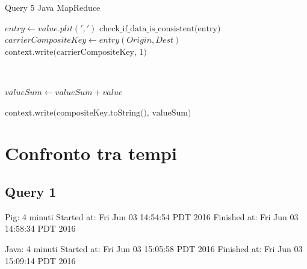 \documentclass[11pt]{article} %
\begin{document}
\begin{algorithm}
\caption{Query 5 Java MapReduce}\label{euclid}
\begin{algorithmic}[0]


\State $entry \gets value.plit(',')$
\State $\text{check\_if\_data\_is\_consistent(entry)}$
\State $carrierCompositeKey \gets entry(Origin, Dest)$
\State $\text{context.write(carrierCompositeKey, 1)}$

\EndProcedure

~


	\State $valueSum \gets valueSum + value$
\EndFor

\State $\text{context.write(compositeKey.toString(), valueSum)}$

\EndProcedure


\end{algorithmic}
\end{algorithm}


\section{Confronto tra tempi}

\subsection{Query 1}
Pig: 4 minuti	 Started at: Fri Jun 03 14:54:54 PDT 2016	 Finished at: Fri Jun 03 14:58:34 PDT 2016

Java: 4 minuti	 Started at: Fri Jun 03 15:05:58 PDT 2016	 Finished at: Fri Jun 03 15:09:14 PDT 2016
\end{document}
